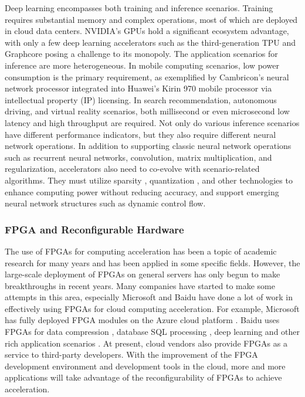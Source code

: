 Deep learning encompasses both training and inference scenarios. Training requires substantial memory and complex operations, most of which are deployed in cloud data centers. NVIDIA's GPUs hold a significant ecosystem advantage, with only a few deep learning accelerators such as the third-generation TPU and Graphcore \cite{graphcore} posing a challenge to its monopoly. The application scenarios for inference are more heterogeneous. In mobile computing scenarios, low power consumption is the primary requirement, as exemplified by Cambricon's neural network processor integrated into Huawei's Kirin 970 mobile processor via intellectual property (IP) licensing. In search recommendation, autonomous driving, and virtual reality scenarios, both millisecond or even microsecond low latency and high throughput are required. Not only do various inference scenarios have different performance indicators, but they also require different neural network operations. In addition to supporting classic neural network operations such as recurrent neural networks, convolution, matrix multiplication, and regularization, accelerators also need to co-evolve with scenario-related algorithms. They must utilize sparsity \cite{yao2018balanced,cao2019efficient}, quantization \cite{zhang2015optimizing}, and other technologies to enhance computing power without reducing accuracy, and support emerging neural network structures such as dynamic control flow.

\subsubsection{FPGA and Reconfigurable Hardware}

The use of FPGAs for computing acceleration has been a topic of academic research for many years and has been applied in some specific fields. However, the large-scale deployment of FPGAs on general servers has only begun to make breakthroughs in recent years. Many companies have started to make some attempts in this area, especially Microsoft and Baidu have done a lot of work in effectively using FPGAs for cloud computing acceleration. For example, Microsoft has fully deployed FPGA modules on the Azure cloud platform \cite{putnam2014reconfigurable,caulfield2016cloud}. Baidu uses FPGAs for data compression \cite{ouyang2010fpga}, database SQL processing \cite{baidu-fpga-sql}, deep learning \cite{ouyang2014sda} and other rich application scenarios \cite{ouyang2017xpu}. At present, cloud vendors also provide FPGAs as a service to third-party developers. With the improvement of the FPGA development environment and development tools in the cloud, more and more applications will take advantage of the reconfigurability of FPGAs to achieve acceleration.

